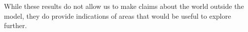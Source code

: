 

While these results do not allow us to make claims about the world outside the model, they do provide indications of areas that would be useful to explore further. 